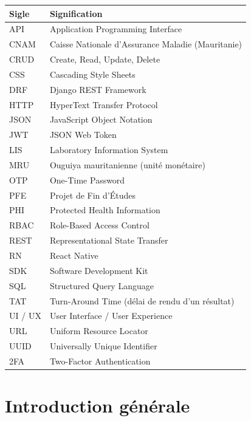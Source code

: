 \documentclass[12pt, a4paper, oneside]{report}
\begin{document}
\begin{tabularx}{\linewidth}{l X}
  \toprule
  \textbf{Sigle} & \textbf{Signification} \\
  \midrule
  API     & Application Programming Interface \\
  CNAM    & Caisse Nationale d'Assurance Maladie (Mauritanie) \\
  CRUD    & Create, Read, Update, Delete \\
  CSS     & Cascading Style Sheets \\
  DRF     & Django REST Framework \\
  HTTP    & HyperText Transfer Protocol \\
  JSON    & JavaScript Object Notation \\
  JWT     & JSON Web Token \\
  LIS     & Laboratory Information System \\
  MRU     & Ouguiya mauritanienne (unité monétaire) \\
  OTP     & One-Time Password \\
  PFE     & Projet de Fin d'Études \\
  PHI     & Protected Health Information \\
  RBAC    & Role-Based Access Control \\
  REST    & Representational State Transfer \\
  RN      & React Native \\
  SDK     & Software Development Kit \\
  SQL     & Structured Query Language \\
  TAT     & Turn-Around Time (délai de rendu d'un résultat) \\
  UI / UX & User Interface / User Experience \\
  URL     & Uniform Resource Locator \\
  UUID    & Universally Unique Identifier \\
  2FA     & Two-Factor Authentication \\
  \bottomrule
\end{tabularx}
\newpage

\chapter*{Introduction générale}
\end{document}

